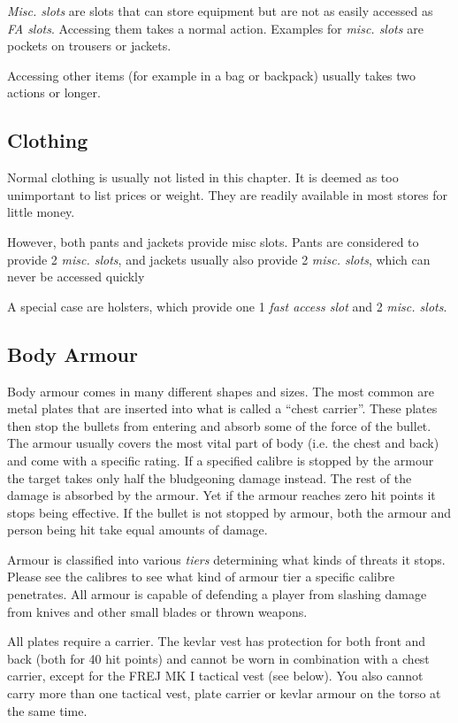 \emph{Misc. slots} are slots that can store equipment but are not as easily
accessed as \emph{FA slots}. Accessing them takes a normal action. Examples
for \emph{misc. slots} are pockets on trousers or jackets.

Accessing other items (for example in a bag or backpack) usually takes two
actions or longer.

\subsection{Clothing}
\label{sub:10-Clothing}

Normal clothing is usually not listed in this chapter. It is deemed as too
unimportant to list prices or weight. They are readily available in most stores
for little money.

However, both pants and jackets provide misc slots. Pants are considered to
provide 2 \emph{misc. slots}, and jackets usually also provide 2
\emph{misc. slots}, which can never be accessed quickly

A special case are holsters, which provide one 1 \emph{fast access slot} and
2 \emph{misc. slots}.

\subsection{Body Armour}
\label{sub:10-Body Armour}

Body armour comes in many different shapes and sizes. The most common are metal
plates that are inserted into what is called a ``chest carrier''. These plates
then stop the bullets from entering and absorb some of the force of the bullet.
The armour usually covers the most vital part of body (i.e. the chest and back)
and come with a specific rating. If a specified calibre is stopped by the
armour the target takes only half the bludgeoning damage instead. The rest of
the damage is absorbed by the armour. Yet if the armour reaches zero hit points
it stops being effective. If the bullet is not stopped by armour, both the
armour and person being hit take equal amounts of damage.

Armour is classified into various \emph{tiers} determining what kinds of threats
it stops. Please see the calibres to see what kind of armour tier a specific
calibre penetrates. All armour is capable of defending a player from slashing
damage from knives and other small blades or thrown weapons.

All plates require a carrier. The kevlar vest has protection for both front
and back (both for 40 hit points) and cannot be worn in combination with a
chest carrier, except for the FREJ MK I tactical vest (see below). You also
cannot carry more than one tactical vest, plate carrier or kevlar armour on
the torso at the same time.


